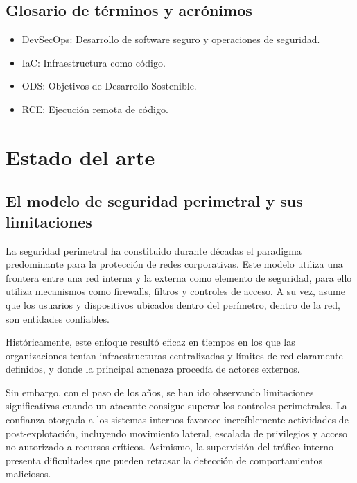 \documentclass[11pt,spanish,listoffigures,listoftables]{tfgetsinf}
\begin{document}
    \section{Glosario de términos y acrónimos}
    \begin{itemize}
        \item DevSecOps: Desarrollo de software seguro y operaciones de seguridad.
        \item IaC: Infraestructura como código.
        \item ODS: Objetivos de Desarrollo Sostenible.
        \item RCE: Ejecución remota de código.
    \end{itemize}





\chapter{Estado del arte}
    \section{El modelo de seguridad perimetral y sus limitaciones}
    La seguridad perimetral ha constituido durante décadas el paradigma predominante para la protección de redes corporativas. Este modelo utiliza una frontera entre una red interna y la externa como elemento de seguridad, para ello utiliza mecanismos como firewalls, filtros y controles de acceso. A su vez, asume que los usuarios y dispositivos ubicados dentro del perímetro, dentro de la red, son entidades confiables.
    
    Históricamente, este enfoque resultó eficaz en tiempos en los que las organizaciones tenían infraestructuras centralizadas y límites de red claramente definidos, y donde la principal amenaza procedía de actores externos.
    
    Sin embargo, con el paso de los años, se han ido observando limitaciones significativas cuando un atacante consigue superar los controles perimetrales. La confianza otorgada a los sistemas internos favorece increíblemente actividades de post-explotación, incluyendo movimiento lateral, escalada de privilegios y acceso no autorizado a recursos críticos. Asimismo, la supervisión del tráfico interno presenta dificultades que pueden retrasar la detección de comportamientos maliciosos.
    
\end{document}

